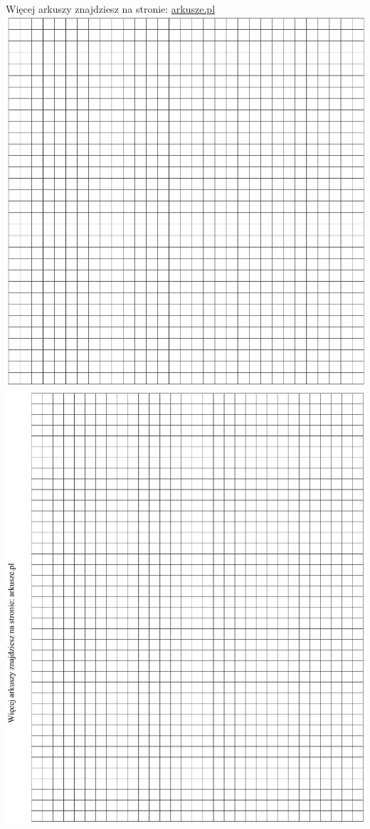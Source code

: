 \documentclass[10pt]{article}
\begin{document}
Więcej arkuszy znajdziesz na stronie: \href{http://arkusze.pl}{arkusze.pl}\\
\includegraphics[max width=\textwidth, center]{2024_11_21_5229b9d0453456f1828dg-18(1)}\\
\includegraphics[max width=\textwidth, center]{2024_11_21_5229b9d0453456f1828dg-19}
\end{document}
